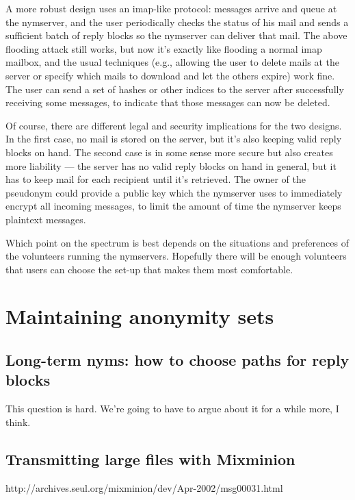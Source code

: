 \documentclass{llncs}
\begin{document}
A more robust design uses an imap-like protocol: messages arrive and queue
at the nymserver, and the user periodically checks the status of his mail
and sends a sufficient batch of reply blocks so the nymserver can deliver
that mail. The above flooding attack still works, but now it's exactly
like flooding a normal imap mailbox, and the usual techniques (e.g.,
allowing the user to delete mails at the server or specify which mails to
download and let the others expire) work fine. The user can send a set
of hashes or other indices to the server after successfully receiving
some messages, to indicate that those messages can now be deleted.

Of course, there are different legal and security implications for the two
designs. In the first case, no mail is stored on the server, but it's also
keeping valid reply blocks on hand. The second case is in some sense more
secure but also creates more liability --- the server has no valid reply
blocks on hand in general, but it has to keep mail for each recipient
until it's retrieved. The owner of the pseudonym could provide a public
key which the nymserver uses to immediately encrypt all incoming messages,
to limit the amount of time the nymserver keeps plaintext messages.

Which point on the spectrum is best depends on the situations and
preferences of the volunteers running the nymservers. Hopefully there
will be enough volunteers that users can choose the set-up that makes
them most comfortable.


\section{Maintaining anonymity sets}

\subsection{Long-term nyms: how to choose paths for reply blocks}

This question is hard. We're going to have to argue about it for a
while more, I think.

\subsection{Transmitting large files with Mixminion}

http://archives.seul.org/mixminion/dev/Apr-2002/msg00031.html
\end{document}
